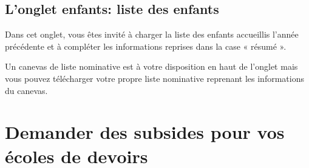 \subsection {L'onglet enfants: liste des enfants}

Dans cet onglet, vous êtes invité à charger la liste des enfants accueillis l’année précédente et à compléter les informations reprises dans la case « résumé ».
\begin{info}
Un canevas de liste nominative est à votre disposition en haut de l’onglet mais vous pouvez télécharger votre propre liste nominative reprenant les informations du canevas.
\end{info}


\section{Demander des subsides pour vos écoles de devoirs}

